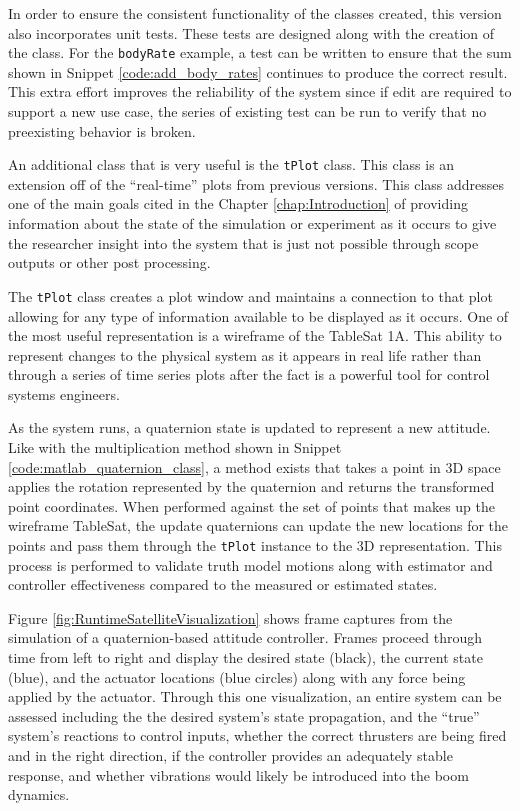 In order to ensure the consistent functionality of the classes created, this version also incorporates unit tests.  These tests are designed along with the creation of the class.  For the \verb|bodyRate| example, a test can be written to ensure that the sum shown in Snippet \ref{code:add_body_rates} continues to produce the correct result.  This extra effort improves the reliability of the system since if edit are required to support a new use case, the series of existing test can be run to verify that no preexisting behavior is broken.

An additional class that is very useful is the \verb|tPlot| class.  This class is an extension off of the ``real-time'' plots from previous versions.  This class addresses one of the main goals cited in the Chapter \ref{chap:Introduction} of providing information about the state of the simulation or experiment as it occurs to give the researcher insight into the system that is just not possible through scope outputs or other post processing.

The \verb|tPlot| class creates a plot window and maintains a connection to that plot allowing for any type of information available to be displayed as it occurs.  One of the most useful representation is a wireframe of the TableSat 1A.  This ability to represent changes to the physical system as it appears in real life rather than through a series of time series plots after the fact is a powerful tool for control systems engineers.

As the system runs, a quaternion state is updated to represent a new attitude.  Like with the multiplication method shown in Snippet \ref{code:matlab_quaternion_class}, a method exists that takes a point in 3D space applies the rotation represented by the quaternion and returns the transformed point coordinates.  When performed against the set of points that makes up the wireframe TableSat, the update quaternions can update the new locations for the points and pass them through the \verb|tPlot| instance to the 3D representation.  This process is performed to validate truth model motions along with estimator and controller effectiveness compared to the measured or estimated states.

Figure \ref{fig:RuntimeSatelliteVisualization} shows frame captures from the simulation of a quaternion-based attitude controller.  Frames proceed through time from left to right and display the desired state (black), the current state (blue), and the actuator locations (blue circles) along with any force being applied by the actuator.  Through this one visualization, an entire system can be assessed including the the desired system's state propagation, and the ``true'' system's reactions to control inputs, whether the correct thrusters are being fired and in the right direction, if the controller provides an adequately stable response, and whether vibrations would likely be introduced into the boom dynamics.

